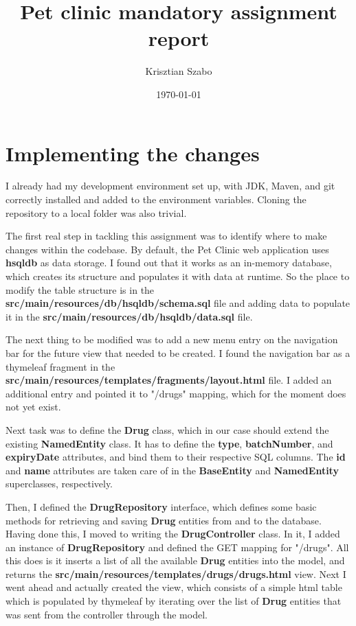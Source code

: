 \documentclass[12pt, a4paper]{article}
\title{Pet clinic mandatory assignment report}
\author{Krisztian Szabo}
\date{\today{}}
\begin{document}
\maketitle
{}
\newpage
{}
\section{Implementing the changes}
I already had my development environment set up, with JDK, Maven, and git correctly installed and added to the environment variables. Cloning the repository to a local folder was also trivial.

The first real step in tackling this assignment was to identify where to make changes within the codebase. By default, the Pet Clinic web application uses \textbf{hsqldb} as data storage. I found out that it works as an in-memory database, which creates its structure and populates it with data at runtime. So the place to modify the table structure is in the \textbf{src/main/resources/db/hsqldb/schema.sql} file and adding data to populate it in the \textbf{src/main/resources/db/hsqldb/data.sql} file.

The next thing to be modified was to add a new menu entry on the navigation bar for the future view that needed to be created. I found the navigation bar as a thymeleaf fragment in the \textbf{src/main/resources/templates/fragments/layout.html} file. I added an additional entry and pointed it to "/drugs" mapping, which for the moment does not yet exist.

Next task was to define the \textbf{Drug} class, which in our case should extend the existing \textbf{NamedEntity} class. It has to define the \textbf{type}, \textbf{batchNumber}, and \textbf{expiryDate} attributes, and bind them to their respective SQL columns. The \textbf{id} and \textbf{name} attributes are taken care of in the \textbf{BaseEntity} and \textbf{NamedEntity} superclasses, respectively.

Then, I defined the \textbf{DrugRepository} interface, which defines some basic methods for retrieving and saving \textbf{Drug} entities from and to the database. Having done this, I moved to writing the \textbf{DrugController} class. In it, I added an instance of \textbf{DrugRepository} and defined the GET mapping for "/drugs". All this does is it inserts a list of all the available \textbf{Drug} entities into the model, and returns the \textbf{src/main/resources/templates/drugs/drugs.html} view. Next I went ahead and actually created the view, which consists of a simple html table which is populated by thymeleaf by iterating over the list of \textbf{Drug} entities that was sent from the controller through the model.
\end{document}
